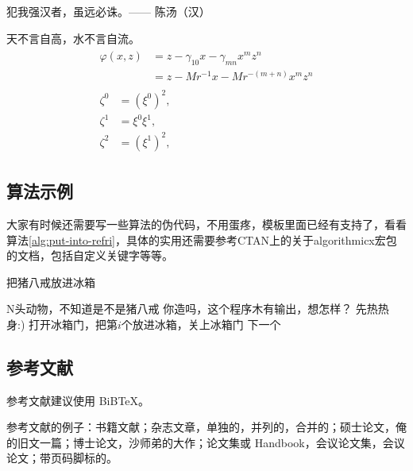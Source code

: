 \begin{theo}
犯我强汉者，虽远必诛。\hfill —— 陈汤（汉）
\end{theo}

\begin{pro}
天不言自高，水不言自流。
\begin{gather*}
\begin{split} 
\varphi(x,z)
&=z-\gamma_{10}x-\gamma_{mn}x^mz^n\\
&=z-Mr^{-1}x-Mr^{-(m+n)}x^mz^n
\end{split}\\[6pt]
\begin{align} \zeta^0&=(\xi^0)^2,\\
\zeta^1 &=\xi^0\xi^1,\\
\zeta^2 &=(\xi^1)^2,
\end{align}
\end{gather*}
\end{pro}

\subsection{算法示例}

大家有时候还需要写一些算法的伪代码，不用蛋疼，模板里面已经有支持了，看看算法\ref{alg:put-into-refri}，具体的实用还需要参考CTAN上的关于{\textsf{algorithmicx}}宏包的文档，包括自定义关键字等等。

\begin{algorithm}
\caption{把猪八戒放进冰箱}
\label{alg:put-into-refri}
\begin{algorithmic}[1]
\Require N头动物，不知道是不是猪八戒   
\Ensure 你造吗，这个程序木有输出，想怎样？
\State 先热热身:)
 
	\State 打开冰箱门，把第$i$个放进冰箱，关上冰箱门
\Else 
	\State 下一个
\EndIf
\EndFor
\end{algorithmic}
\end{algorithm}

\subsection{参考文献}

参考文献建议使用 BiB\TeX 。

参考文献的例子：书籍文献\cite{tex,companion}；杂志文章，单独的\cite{article1}，并列的\cite{article2,article3}，合并的\cite{article1,article2,article3}；硕士论文\cite{master}，俺的旧文一篇；博士论文\cite{doctor}，沙师弟的大作；论文集或 Handbook\cite{collection}，会议论文集\cite{proceeding}，会议论文\cite{conference}；带页码脚标的\cite[123]{tex}。


